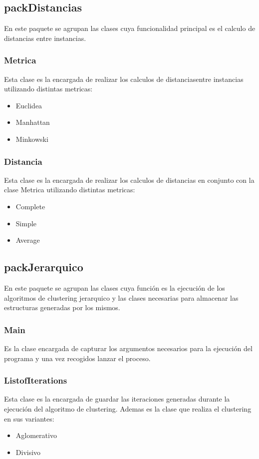 \documentclass[11pt, titlepage,a4paper]{article}
\begin{document}
\subsection{packDistancias}
\label{packDistancias}
En este paquete se agrupan las clases cuya funcionalidad principal es el calculo
de distancias entre instancias.

\subsubsection{Metrica}
Esta clase es la encargada de realizar los calculos de distanciasentre
instancias utilizando distintas metricas:
\begin{itemize}
  \item Euclidea
  \item Manhattan
  \item Minkowski
\end{itemize}

\subsubsection{Distancia}
Esta clase es la encargada de realizar los calculos de distancias en conjunto
con la clase Metrica utilizando distintas metricas:
\begin{itemize}
  \item Complete
  \item Simple
  \item Average
\end{itemize}

\subsection{packJerarquico}
En este paquete se agrupan las clases cuya función es la ejecución de los
algoritmos de clustering jerarquico y las clases necesarias para almacenar las
estructuras generadas por los mismos.

\subsubsection{Main}
Es la clase encargada de capturar los argumentos necesarios para la ejecución
del programa y una vez recogidos lanzar el proceso.
 
\subsubsection{ListofIterations}
Esta clase es la encargada de guardar las iteraciones generadas durante la
ejecución del algoritmo de clustering. Ademas es la clase que realiza el
clustering en sus variantes:
\begin{itemize}
  \item Aglomerativo
  \item Divisivo
\end{itemize}
\end{document}
